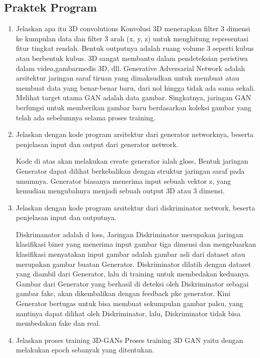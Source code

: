 \subsection{Praktek Program}
\begin{enumerate}
	\item  Jelaskan apa itu 3D convolutions
    \hfill\break
    Konvolusi 3D menerapkan ﬁlter 3 dimensi ke kumpulan data dan ﬁlter 3 arah (x, y, z) untuk menghitung representasi ﬁtur tingkat rendah. Bentuk outputnya adalah ruang volume 3 seperti kubus atau berbentuk kubus. 3D sangat membantu dalam pendeteksian peristiwa dalam video,gambarmedis 3D, dll. Generative Adversarial Network adalah arsitektur jaringan saraf tiruan yang dimaksudkan untuk membuat atau membuat data yang benar-benar baru, dari nol hingga tidak ada sama sekali. Melihat target utama GAN adalah data gambar. Singkatnya, jaringan GAN berfungsi untuk memberikan gambar baru berdasarkan koleksi gambar yang telah ada sebelumnya selama proses training. 
	
	\item  Jelaskan dengan kode program arsitektur dari generator networknya, beserta penjelasan input dan output dari generator network.
	\hfill\break
    
    Kode di atas akan melakukan create generator ialah gloss, Bentuk jaringan Generator dapat dilihat berkebalikan dengan struktur jaringan saraf pada umumnya. Generator biasanya menerima input sebuah vektor z, yang kemudian mengubahnya menjadi sebuah output 3D atau 3 dimensi.
    
	\item  Jelaskan dengan kode program arsitektur dari diskriminator network, beserta penjelasan input dan outputnya.
	\hfill\break
	
	Diskrimanator adalah d loss, Jaringan Diskriminator merupakan jaringan klasiﬁkasi biner yang menerima input gambar tiga dimensi dan mengeluarkan klasiﬁkasi menyatakan input gambar adalah gambar asli dari dataset atau merupakan gambar buatan Generator. Diskriminator dilatih dengan dataset yang diambil dari Generator, lalu di training untuk membedakan keduanya. Gambar dari Generator yang berhasil di deteksi oleh Diskriminator sebagai gambar fake, akan dikembalikan dengan feedback pke generator. Kini Generator bertugas untuk bisa membuat sekumpulan gambar palsu, yang nantinya dapat dilihat oleh Diskriminator, lalu, Diskriminator tidak bisa membedakan fake dan real.

	\item Jelaskan proses training 3D-GANs
    \hfill\break
    Proses training 3D GAN yaitu dengan melakukan epoch sebanyak yang ditentukan.


\end{enumerate}
